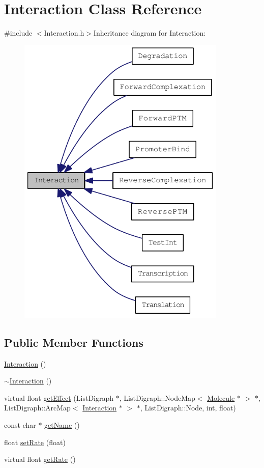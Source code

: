 \hypertarget{classInteraction}{
\section{Interaction Class Reference}
\label{classInteraction}
}


{\ttfamily \#include $<$Interaction.h$>$}Inheritance diagram for Interaction:\nopagebreak
\begin{figure}[H]
\begin{center}
\leavevmode
\includegraphics[width=282pt]{classInteraction__inherit__graph}
\end{center}
\end{figure}
\subsection*{Public Member Functions}
\begin{DoxyCompactItemize}
\item 
\hyperlink{classInteraction_aadfd0e254296043c26508d47090ace76}{Interaction} ()
\item 
\hyperlink{classInteraction_a6610199fedc7fae617003cb2f397c825}{$\sim$Interaction} ()
\item 
virtual float \hyperlink{classInteraction_a6328831e714adf9c8177f6052d2e017f}{getEffect} (ListDigraph $\ast$, ListDigraph::NodeMap$<$ \hyperlink{classMolecule}{Molecule} $\ast$ $>$ $\ast$, ListDigraph::ArcMap$<$ \hyperlink{classInteraction}{Interaction} $\ast$ $>$ $\ast$, ListDigraph::Node, int, float)
\item 
const char $\ast$ \hyperlink{classInteraction_a64c55f6b12dca30cc1793c30614220f4}{getName} ()
\item 
float \hyperlink{classInteraction_a82197452596f6bd849df062c5f9d9714}{setRate} (float)
\item 
virtual float \hyperlink{classInteraction_a5ff512276a432b6aa172e719d4866131}{getRate} ()
\end{DoxyCompactItemize}
